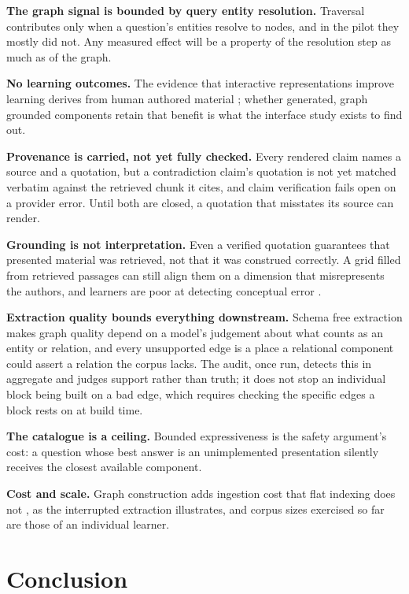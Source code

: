 \documentclass[conference]{IEEEtran}
\begin{document}
\textbf{The graph signal is bounded by query entity resolution.} Traversal contributes only when a question's entities resolve to nodes, and in the pilot they mostly did not. Any measured effect will be a property of the resolution step as much as of the graph.

\textbf{No learning outcomes.} The evidence that interactive representations improve learning derives from human authored material \cite{ref:phetmeta,ref:mayer}; whether generated, graph grounded components retain that benefit is what the interface study exists to find out.

\textbf{Provenance is carried, not yet fully checked.} Every rendered claim names a source and a quotation, but a contradiction claim's quotation is not yet matched verbatim against the retrieved chunk it cites, and claim verification fails open on a provider error. Until both are closed, a quotation that misstates its source can render.

\textbf{Grounding is not interpretation.} Even a verified quotation guarantees that presented material was retrieved, not that it was construed correctly. A grid filled from retrieved passages can still align them on a dimension that misrepresents the authors, and learners are poor at detecting conceptual error \cite{ref:shoufan}.

\textbf{Extraction quality bounds everything downstream.} Schema free extraction makes graph quality depend on a model's judgement about what counts as an entity or relation, and every unsupported edge is a place a relational component could assert a relation the corpus lacks. The audit, once run, detects this in aggregate and judges support rather than truth; it does not stop an individual block being built on a bad edge, which requires checking the specific edges a block rests on at build time.

\textbf{The catalogue is a ceiling.} Bounded expressiveness is the safety argument's cost: a question whose best answer is an unimplemented presentation silently receives the closest available component.

\textbf{Cost and scale.} Graph construction adds ingestion cost that flat indexing does not \cite{ref:lightrag}, as the interrupted extraction illustrates, and corpus sizes exercised so far are those of an individual learner.

\section{Conclusion}
\end{document}
